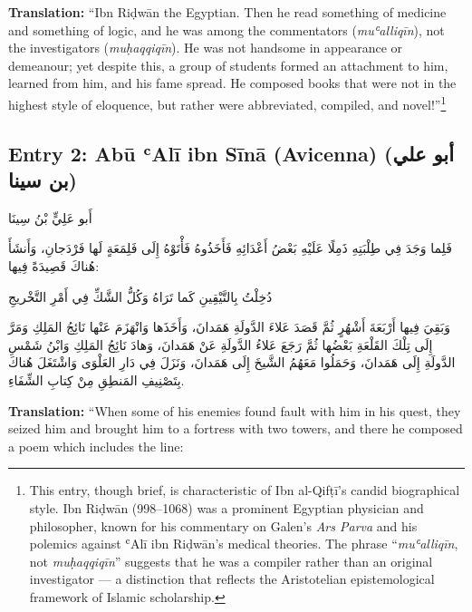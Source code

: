 \documentclass[11pt,a4paper]{article}
\def\RL#1{\beginR#1\endR}
\newcommand{\arabicblock}[1]{{\arabicfont\RL{#1}}}
\newcommand{\textarabic}[1]{{\arabicfont\RL{#1}}}
\begin{document}
\vspace{0.3cm}

\noindent\textbf{Translation:} ``Ibn Riḍwān the Egyptian. Then he read something of medicine and something of logic, and he was among the commentators (\textit{muʿalliqīn}), not the investigators (\textit{muḥaqqiqīn}). He was not handsome in appearance or demeanour; yet despite this, a group of students formed an attachment to him, learned from him, and his fame spread. He composed books that were not in the highest style of eloquence, but rather were abbreviated, compiled, and novel!''\footnote{This entry, though brief, is characteristic of Ibn al-Qifṭī's candid biographical style. Ibn Riḍwān (998--1068) was a prominent Egyptian physician and philosopher, known for his commentary on Galen's \textit{Ars Parva} and his polemics against ʿAlī ibn Riḍwān's medical theories. The phrase ``\textit{muʿalliqīn}, not \textit{muḥaqqiqīn}'' suggests that he was a compiler rather than an original investigator --- a distinction that reflects the Aristotelian epistemological framework of Islamic scholarship.}

\subsection{Entry 2: Abū ʿAlī ibn Sīnā (Avicenna) \textarabic{(أبو علي بن سينا)}}

\arabicblock{%
أَبو عَلِيٍّ بْنُ سِينَا

فَلِما وَجَدَ فِي طِلْبَتِهِ ذَمِلًا عَلَيْهِ بَعْضُ أَعْدَائِهِ فَأَخَذُوهُ فَأْتَوْهُ إِلَى فَلِمَعَةٍ لَها فَرْدَجانِ، وَأَنشَأَ هُناكَ قَصِيدَةً فِيها:

دُخِلْتُ بِالتَّيْقِينِ كَما تَرَاهُ وَكُلُّ الشَّكِّ فِي أَمْرِ التَّخْريجِ

وَبَقِيَ فِيها أَرْبَعَةَ أَشْهُرٍ ثُمَّ قَصَدَ عَلاءَ الدَّولَةِ هَمَدانَ، وَأَخَذَها وَانْهَزَمَ عَنْها نَائِجُ المَلِكِ وَمَرَّ إِلَى تِلْكَ القَلْعَةِ بَعْضُها ثُمَّ رَجَعَ عَلاءُ الدَّولَةِ عَنْ هَمَدانَ، وَهادَ نَائِجُ المَلِكِ وَابْنُ شَمْسِ الدَّولَةِ إِلَى هَمَدانَ، وَحَمَلُوا مَعَهُمُ الشَّيخَ إِلَى هَمَدانَ، وَنَزَلَ فِي دَارِ العَلْوَى وَاشْتَغَلَ هُناكَ بِتَصْنِيفِ المَنطِقِ مِنْ كِتابِ الشِّفَاءِ.%
}

\vspace{0.3cm}

\noindent\textbf{Translation:} ``When some of his enemies found fault with him in his quest, they seized him and brought him to a fortress with two towers, and there he composed a poem which includes the line:\\
\end{document}
